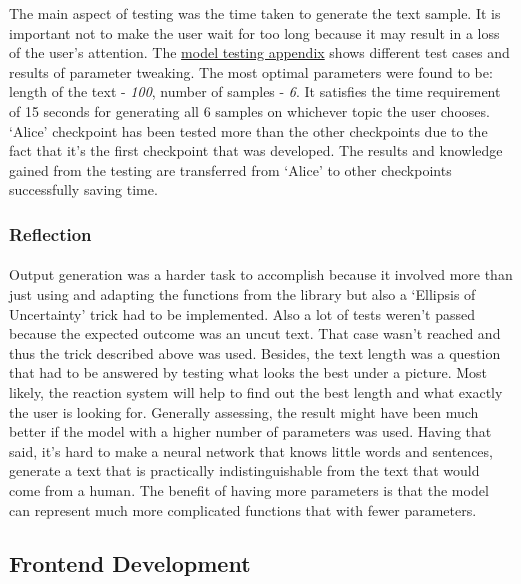 \documentclass[12pt]{report}
\begin{document}
The main aspect of testing was the time taken to generate the text sample. It is important not to make the user
wait for too long because it may result in a loss of the user's attention. The \hyperref[appendix:model_testing]{model testing appendix}
shows different test cases and results of parameter tweaking. The most optimal parameters were found to be: length
of the text - \textit{100}, number of samples - \textit{6}. It satisfies the time requirement of 15 seconds for generating 
all 6 samples on whichever topic the user chooses. `Alice' checkpoint has been tested more than the other checkpoints due
to the fact that it's the first checkpoint that was developed. The results and knowledge gained from the testing are transferred
from `Alice' to other checkpoints successfully saving time.

\subsubsection*{Reflection}
\paragraph{}
Output generation was a harder task to accomplish because it involved more than just using and adapting the functions
from the library but also a `Ellipsis of Uncertainty' trick had to be implemented. Also a lot of tests weren't passed
because the expected outcome was an uncut text. That case wasn't reached and thus the trick described above was used.
Besides, the text length was a question that had to be answered by testing what looks the best under a picture. 
Most likely, the reaction system will help to find out the best length and what exactly the user is looking for.
Generally assessing, the result might have been much better if the model with a higher number of parameters was used.
Having that said, it's hard to make a neural network that knows little words and sentences, generate a text that is
practically indistinguishable from the text that would come from a human. The benefit of having more parameters is that
the model can represent much more complicated functions that with fewer parameters.

\clearpage

\subsection*{Frontend Development}
\end{document}
